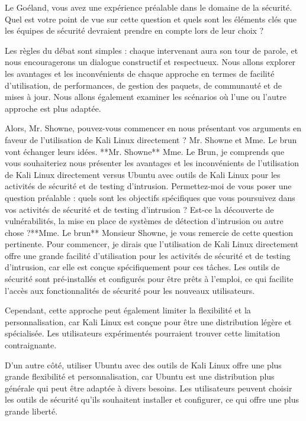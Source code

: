 Le Goéland, vous avez une expérience préalable dans le domaine de la sécurité. Quel est votre point de vue sur cette question et quels sont les éléments clés que les équipes de sécurité devraient prendre en compte lors de leur choix ?

Les règles du débat sont simples : chaque intervenant aura son tour de parole, et nous encouragerons un dialogue constructif et respectueux. Nous allons explorer les avantages et les inconvénients de chaque approche en termes de facilité d'utilisation, de performances, de gestion des paquets, de communauté et de mises à jour. Nous allons également examiner les scénarios où l'une ou l'autre approche est plus adaptée.

Alors, Mr. Showne, pouvez-vous commencer en nous présentant vos arguments en faveur de l'utilisation de Kali Linux directement ?
Mr. Showne et Mme. Le brun vont échanger leurs idées.
**Mr. Showne**
Mme. Le Brun, je comprends que vous souhaiteriez nous présenter les avantages et les inconvénients de l'utilisation de Kali Linux directement versus Ubuntu avec outils de Kali Linux pour les activités de sécurité et de testing d'intrusion. Permettez-moi de vous poser une question préalable : quels sont les objectifs spécifiques que vous poursuivez dans vos activités de sécurité et de testing d'intrusion ? Est-ce la découverte de vulnérabilités, la mise en place de systèmes de détection d'intrusion ou autre chose ?**Mme. Le brun**
Monsieur Showne, je vous remercie de cette question pertinente. Pour commencer, je dirais que l'utilisation de Kali Linux directement offre une grande facilité d'utilisation pour les activités de sécurité et de testing d'intrusion, car elle est conçue spécifiquement pour ces tâches. Les outils de sécurité sont pré-installés et configurés pour être prêts à l'emploi, ce qui facilite l'accès aux fonctionnalités de sécurité pour les nouveaux utilisateurs.

Cependant, cette approche peut également limiter la flexibilité et la personnalisation, car Kali Linux est conçue pour être une distribution légère et spécialisée. Les utilisateurs expérimentés pourraient trouver cette limitation contraignante.

D'un autre côté, utiliser Ubuntu avec des outils de Kali Linux offre une plus grande flexibilité et personnalisation, car Ubuntu est une distribution plus générale qui peut être adaptée à divers besoins. Les utilisateurs peuvent choisir les outils de sécurité qu'ils souhaitent installer et configurer, ce qui offre une plus grande liberté.

